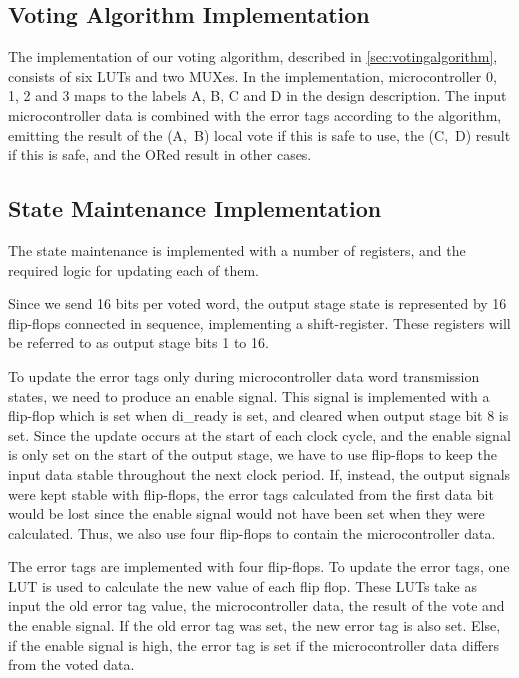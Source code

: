 \subsection{Voting Algorithm Implementation}
The implementation of our voting algorithm, described in
\autoref{sec:votingalgorithm}, consists of six LUTs and two MUXes. In
the implementation, microcontroller 0, 1, 2 and 3 maps to the labels
A, B, C and D in the design description. The input microcontroller
data is combined with the error tags according to the algorithm,
emitting the result of the (A,~B) local vote if this is safe to use,
the (C,~D) result if this is safe, and the ORed result in other cases.


\subsection{State Maintenance Implementation}
\label{sec:statemaintenance}
The state maintenance is implemented with a number of registers, and
the required logic for updating each of them.

Since we send 16 bits per voted word, the output stage state is
represented by 16 flip-flops connected in sequence, implementing a
shift-register. These registers will be referred to as output stage
bits 1 to 16. 

To update the error tags only during microcontroller data word
transmission states, we need to produce an enable signal. This signal
is implemented with a flip-flop which is set when {\ttfamily di\_ready} is set,
and cleared when output stage bit 8 is set. Since the update occurs at
the start of each clock cycle, and the enable signal is only set on
the start of the output stage, we have to use flip-flops to keep the
input data stable throughout the next clock period. If, instead, the
output signals were kept stable with flip-flops, the error tags
calculated from the first data bit would be lost since the enable
signal would not have been set when they were calculated. Thus, we
also use four flip-flops to contain the microcontroller data.

The error tags are implemented with four flip-flops. To update the
error tags, one LUT is used to calculate the new value of each flip
flop. These LUTs take as input the old error tag value, the
microcontroller data, the result of the vote and the enable
signal.  If the old error tag
was set, the new error tag is also set. Else, if the enable signal is
high, the error tag is set if the microcontroller data differs from
the voted data.

